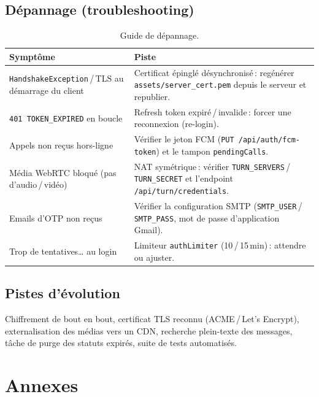 \documentclass[11pt,a4paper,oneside]{report}
\newcommand{\thd}[1]{\textbf{\textcolor{AlanyaIndigoDark}{#1}}}
\begin{document}
\section{D\'{e}pannage (troubleshooting)}
\begin{table}[H]
\centering\small
\begin{tabularx}{\linewidth}{@{}p{5.2cm} X@{}}
\toprule
\thd{Sympt\^{o}me} & \thd{Piste}\\
\midrule
\texttt{HandshakeException}\,/\,TLS au d\'{e}marrage du client & Certificat \'{e}pingl\'{e} d\'{e}synchronis\'{e}\,: reg\'{e}n\'{e}rer \texttt{assets/server\_cert.pem} depuis le serveur et republier.\\
\texttt{401 TOKEN\_EXPIRED} en boucle & Refresh token expir\'{e}\,/\,invalide\,: forcer une reconnexion (re-login).\\
Appels non re\c{c}us hors-ligne & V\'{e}rifier le jeton FCM (\texttt{PUT /api/auth/fcm-token}) et le tampon \texttt{pendingCalls}.\\
M\'{e}dia WebRTC bloqu\'{e} (pas d'audio\,/\,vid\'{e}o) & NAT sym\'{e}trique\,: v\'{e}rifier \texttt{TURN\_SERVERS}\,/\,\texttt{TURN\_SECRET} et l'endpoint \texttt{/api/turn/credentials}.\\
Emails d'OTP non re\c{c}us & V\'{e}rifier la configuration SMTP (\texttt{SMTP\_USER}\,/\,\texttt{SMTP\_PASS}, mot de passe d'application Gmail).\\
\og{}Trop de tentatives\ldots\fg{} au login & Limiteur \texttt{authLimiter} (10\,/\,15\,min)\,: attendre ou ajuster.\\
\bottomrule
\end{tabularx}
\caption{Guide de d\'{e}pannage.}
\end{table}

\section{Pistes d'\'{e}volution}
Chiffrement de bout en bout, certificat TLS reconnu (ACME\,/\,Let's Encrypt),
externalisation des m\'{e}dias vers un CDN, recherche plein-texte des messages,
t\^{a}che de purge des statuts expir\'{e}s, suite de tests automatis\'{e}s.

\appendix
\chapter{Annexes}
\end{document}
